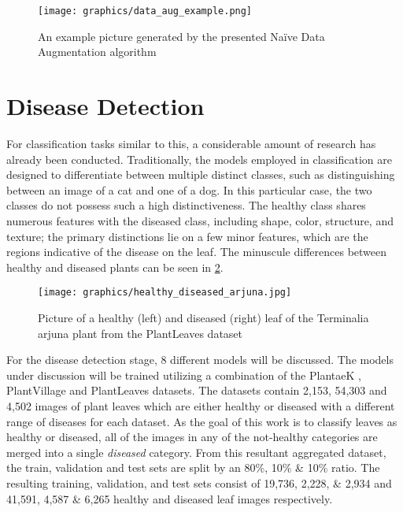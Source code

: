 \documentclass[draft,final]{vutinfth} %
\begin{document}
\begin{figure}[h]
    \centering
    \texttt{[image: graphics/data\_aug\_example.png]}
    \caption{An example picture generated by the presented Na\"ive Data Augmentation algorithm}
    \label{fig:data_aug_example}
\end{figure}

\section{Disease Detection} \label{sec:method_disease}
For classification tasks similar to this, a considerable amount of research has already been conducted. Traditionally, the models employed in classification are designed to differentiate between multiple distinct classes, such as distinguishing between an image of a cat and one of a dog. In this particular case, the two classes do not possess such a high distinctiveness. The healthy class shares numerous features with the diseased class, including shape, color, structure, and texture; the primary distinctions lie on a few minor features, which are the regions indicative of the disease on the leaf. The minuscule differences between healthy and diseased plants can be seen in \ref{fig:healthy_diseased_arjun}.


\begin{figure}
    \centering
    \texttt{[image: graphics/healthy\_diseased\_arjuna.jpg]}
    \caption{Picture of a healthy (left) and diseased (right) leaf of the Terminalia arjuna plant from the PlantLeaves dataset \cite{chouhan_database_2019}}
    \label{fig:healthy_diseased_arjun}
\end{figure}

For the disease detection stage, 8 different models will be discussed. The models under discussion will be trained utilizing a combination of the PlantaeK \cite{kour_plantaek_2019}, PlantVillage \cite{hughes_open_2016} and PlantLeaves \cite{chouhan_database_2019} datasets. The datasets contain 2,153, 54,303 and 4,502 images of plant leaves which are either healthy or diseased with a different range of diseases for each dataset. As the goal of this work is to classify leaves as healthy or diseased, all of the images in any of the not-healthy categories are merged into a single \textit{diseased} category. From this resultant aggregated dataset, the train, validation and test sets are split by an 80\%, 10\% \& 10\% ratio. The resulting training, validation, and test sets consist of 19,736, 2,228, \& 2,934 and 41,591, 4,587 \& 6,265 healthy and diseased leaf images respectively.
\end{document}

